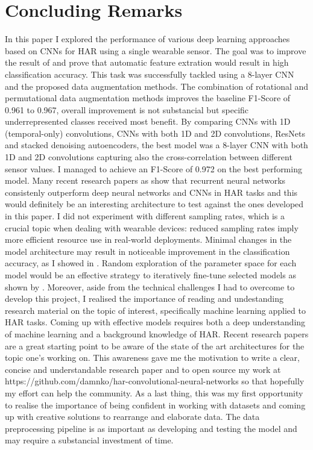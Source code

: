 
\section{Concluding Remarks}
\label{sec:conclusions}
In this paper I explored the performance of various deep learning approaches based on CNNs for HAR using a single wearable sensor. The goal was to improve the result of \cite{base-paper} and prove that automatic feature extration would result in high classification accuracy. This task was successfully tackled using a 8-layer CNN and the proposed data augmentation methods. The combination of rotational and permutational data augmentation methods improves the baseline \mbox{F1-Score} of 0.961 to 0.967, overall improvement is not substancial but specific underrepresented classes received most benefit.
By comparing CNNs with 1D (temporal-only) convolutions, CNNs with both 1D and 2D convolutions, ResNets and stacked denoising autoencoders, the best model was a 8-layer CNN with both 1D and 2D convolutions capturing also the cross-correlation between different sensor values. I managed to achieve an \mbox{F1-Score} of 0.972 on the best performing model.
Many recent research papers as \cite{nils-2016, Valarezo-2017, su-2016} show that recurrent neural networks consistenly outperform deep neural networks and CNNs in HAR tasks and this would definitely be an interesting architecture to test against the ones developed in this paper. I did not experiment with different sampling rates, which is a crucial topic when dealing with wearable devices: reduced sampling rates imply more efficient resource use in \mbox{real-world} deployments. Minimal changes in the model architecture may result in noticeable improvement in the classification accuracy, as I showed in . Random exploration of the parameter space for each model would be an effective strategy to iteratively \mbox{fine-tune} selected models as shown by \cite{nils-2016}.
Moreover, aside from the technical challenges I had to overcome to develop this project, I realised the importance of reading and undestanding research material on the topic of interest, specifically machine learning applied to HAR tasks. Coming up with effective models requires both a deep understanding of machine learning and a background knowledge of HAR. Recent research papers are a great starting point to be aware of the state of the art architectures for the topic one's working on. This awareness gave me the motivation to write a clear, concise and understandable research paper and to open source my work at https://github.com/damnko/har-convolutional-neural-networks so that hopefully my effort can help the community.
As a last thing, this was my first opportunity to realise the importance of being confident in working with datasets and coming up with creative solutions to rearrange and elaborate data. The data preprocessing pipeline is as important as developing and testing the model and may require a substancial investment of time.